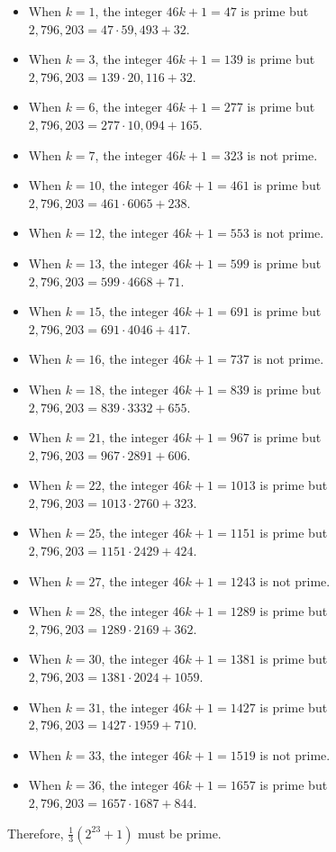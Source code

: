\begin{solution}
\begin{enumerate}
        \begin{itemize}
            \item When $k = 1$, the integer $46k + 1 = 47$ is prime but $2,796,203 = 47\cdot 59,493 + 32$.
            \item When $k = 3$, the integer $46k + 1 = 139$ is prime but $2,796,203 = 139\cdot 20,116 + 32$.
            \item When $k = 6$, the integer $46k + 1 = 277$ is prime but $2,796,203 = 277\cdot 10,094 + 165$.
            \item When $k = 7$, the integer $46k + 1 = 323$ is not prime.
            \item When $k = 10$, the integer $46k + 1 = 461$ is prime but $2,796,203 = 461\cdot 6065 + 238$.
            \item When $k = 12$, the integer $46k + 1 = 553$ is not prime.
            \item When $k = 13$, the integer $46k + 1 = 599$ is prime but $2,796,203 = 599\cdot 4668 + 71$.
            \item When $k = 15$, the integer $46k + 1 = 691$ is prime but $2,796,203 = 691\cdot 4046 + 417$.
            \item When $k = 16$, the integer $46k + 1 = 737$ is not prime.
            \item When $k = 18$, the integer $46k + 1 = 839$ is prime but $2,796,203 = 839\cdot 3332 + 655$.
            \item When $k = 21$, the integer $46k + 1 = 967$ is prime but $2,796,203 = 967\cdot 2891 + 606$.
            \item When $k = 22$, the integer $46k + 1 = 1013$ is prime but $2,796,203 = 1013\cdot 2760 + 323$.
            \item When $k = 25$, the integer $46k + 1 = 1151$ is prime but $2,796,203 = 1151\cdot 2429 + 424$.
            \item When $k = 27$, the integer $46k + 1 = 1243$ is not prime.
            \item When $k = 28$, the integer $46k + 1 = 1289$ is prime but $2,796,203 = 1289\cdot 2169 + 362$.
            \item When $k = 30$, the integer $46k + 1 = 1381$ is prime but $2,796,203 = 1381\cdot 2024 + 1059$.
            \item When $k = 31$, the integer $46k + 1 = 1427$ is prime but $2,796,203 = 1427\cdot 1959 + 710$.
            \item When $k = 33$, the integer $46k + 1 = 1519$ is not prime.
            \item When $k = 36$, the integer $46k + 1 = 1657$ is prime but $2,796,203 = 1657 \cdot 1687 + 844$.
        \end{itemize}
        Therefore, $\frac{1}{3}(2^{23} + 1)$ must be prime. \\
    \end{enumerate}
\end{solution}

